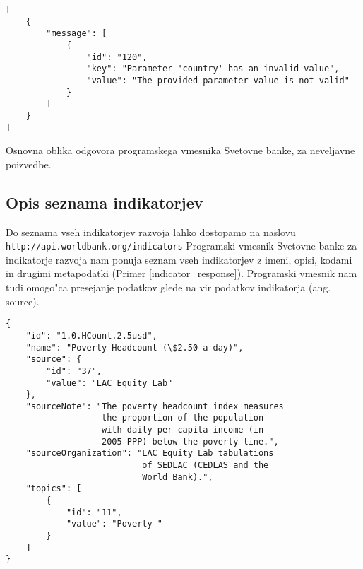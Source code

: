 \begin{snippet}
\begin{center}
\begin{lstlisting}
[
    {
        "message": [
            {
                "id": "120",
                "key": "Parameter 'country' has an invalid value",
                "value": "The provided parameter value is not valid"
            }
        ]
    }
]
\end{lstlisting}
\end{center}
\caption{Osnovna oblika odgovora programskega vmesnika Svetovne banke, za
neveljavne poizvedbe.}
\label{error_response}
\end{snippet} 


\subsection{Opis seznama indikatorjev}

Do seznama vseh indikatorjev razvoja lahko dostopamo na naslovu 
\verb|http://api.worldbank.org/indicators|
Programski vmesnik Svetovne banke za indikatorje razvoja nam ponuja seznam 
vseh indikatorjev z imeni, opisi, kodami in drugimi metapodatki 
(Primer \ref{indicator_response}). Programski vmesnik nam tudi omogo"ca
presejanje podatkov glede na vir podatkov indikatorja (ang. source).

\begin{snippet}
\begin{center}
\begin{lstlisting}
{
    "id": "1.0.HCount.2.5usd",
    "name": "Poverty Headcount (\$2.50 a day)",
    "source": {
        "id": "37",
        "value": "LAC Equity Lab"
    },
    "sourceNote": "The poverty headcount index measures 
                   the proportion of the population
                   with daily per capita income (in 
                   2005 PPP) below the poverty line.",
    "sourceOrganization": "LAC Equity Lab tabulations
                           of SEDLAC (CEDLAS and the
                           World Bank).",
    "topics": [
        {
            "id": "11",
            "value": "Poverty "
        }
    ]
}
\end{lstlisting}
\end{center}
\caption{Podatki indikatorja 
stopnja rev"s"cine pri dohodku 2,5 dolarja na dan.}
\label{indicator_response}
\end{snippet} 

